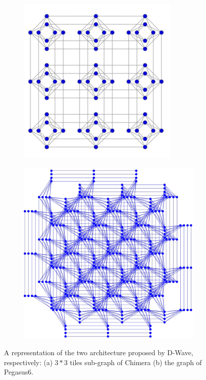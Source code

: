 \begin{figure}
\centering
\begin{subfigure}[b]{0.55\textwidth}
   \includegraphics[width=1\linewidth]{images/QATile.PNG}
   \caption{}
   \label{fig:Ng1} 
\end{subfigure}

\begin{subfigure}[b]{0.55\textwidth}
   \includegraphics[width=1\linewidth]{images/Pegas.PNG}
   \caption{}
   \label{fig:Ng2}
\end{subfigure}
\caption{A representation of the two architecture proposed by D-Wave, respectively: (a) $3*3$ tiles sub-graph of Chimera (b) the graph of Pegasus6.}
\end{figure}

\newpage

